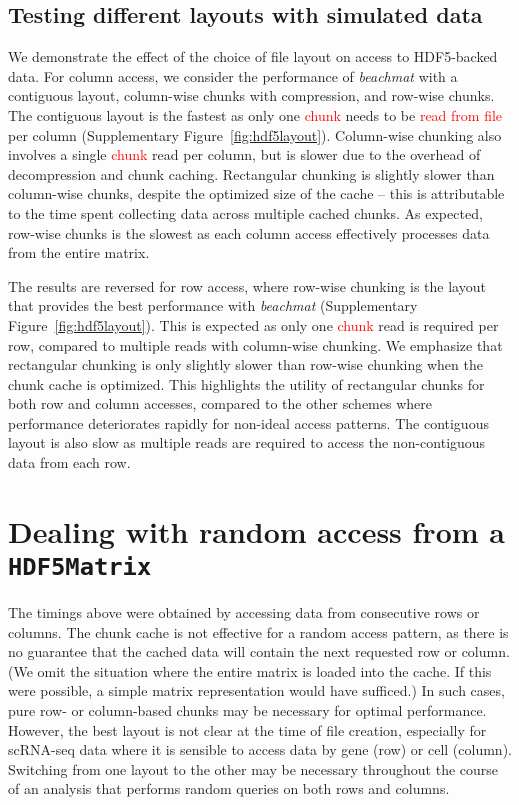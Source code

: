 \documentclass{article}
\newcommand{\beachmat}{\textit{beachmat}}
\newcommand{\revised}[1]{\textcolor{red}{#1}}
\begin{document}
\subsection{Testing different layouts with simulated data}
We demonstrate the effect of the choice of file layout on access to HDF5-backed data.
For column access, we consider the performance of \beachmat{} with a contiguous layout, column-wise chunks with compression, and row-wise chunks.
The contiguous layout is the fastest as only one \revised{chunk} needs to be \revised{read from file} per column (Supplementary Figure~\ref{fig:hdf5layout}).
Column-wise chunking also involves a single \revised{chunk} read per column, but is slower due to the overhead of decompression and chunk caching.
Rectangular chunking is slightly slower than column-wise chunks, despite the optimized size of the cache -- this is attributable to the time spent collecting data across multiple cached chunks.
As expected, row-wise chunks is the slowest as each column access effectively processes data from the entire matrix.

The results are reversed for row access, where row-wise chunking is the layout that provides the best performance with \beachmat{} (Supplementary Figure~\ref{fig:hdf5layout}).
This is expected as only one \revised{chunk} read is required per row, compared to multiple reads with column-wise chunking.
We emphasize that rectangular chunking is only slightly slower than row-wise chunking when the chunk cache is optimized.
This highlights the utility of rectangular chunks for both row and column accesses, compared to the other schemes where performance deteriorates rapidly for non-ideal access patterns.
The contiguous layout is also slow as multiple reads are required to access the non-contiguous data from each row.

\section{Dealing with random access from a \texttt{HDF5Matrix}}
\label{sec:random}

The timings above were obtained by accessing data from consecutive rows or columns.
The chunk cache is not effective for a random access pattern, as there is no guarantee that the cached data will contain the next requested row or column.
(We omit the situation where the entire matrix is loaded into the cache.
If this were possible, a simple matrix representation would have sufficed.)
In such cases, pure row- or column-based chunks may be necessary for optimal performance.
However, the best layout is not clear at the time of file creation, especially for scRNA-seq data where it is sensible to access data by gene (row) or cell (column).
Switching from one layout to the other may be necessary throughout the course of an analysis that performs random queries on both rows and columns.
\end{document}
